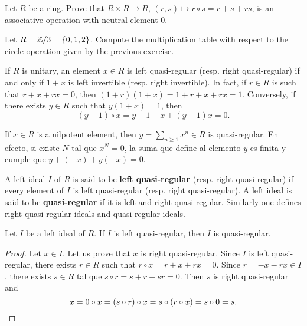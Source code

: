 \begin{exercise}
	\label{exercise:circ}
	Let $R$ be a ring. Prove that $R\times R\to R$,
	$(r,s)\mapsto r\circ s=r+s+rs$, is an associative operation with neutral element $0$.
\end{exercise}

\begin{exercise}
	Let $R=\mathbb{Z}/3=\{0,1,2\}$. Compute the multiplication table with respect to the circle 
 	operation given by the previous exercise.  
\end{exercise}

If $R$ is unitary, an element $x\in R$ is left quasi-regular (resp. right quasi-regular)
if and only if $1+x$ is left invertible (resp. right invertible). In fact, 
if $r\in R$ is such that $r+x+rx=0$, then $(1+r)(1+x)=1+r+x+rx=1$.
Conversely, if there exists $y\in R$ such that $y(1+x)=1$, then  
\[
(y-1)\circ x=y-1+x+(y-1)x=0.
\]

\begin{example}
	If $x\in R$ is a nilpotent element, then $y=\sum_{n\geq1}x^n\in R$ is quasi-regular. 
	En efecto, si existe $N$ tal que $x^N=0$, la suma que
	define al elemento $y$ es finita y cumple que $y+(-x)+y(-x)=0$.  
\end{example}

A left ideal $I$ of $R$ is said to be 
\textbf{left quasi-regular} (resp. right quasi-regular) if every element of $I$ is
left quasi-regular (resp. right quasi-regular). A left ideal 
is said to be \textbf{quasi-regular} if it is left and right quasi-regular. Similarly 
one defines right quasi-regular ideals and quasi-regular ideals. 

\begin{lemma}
	\label{lemma:casiregular}
	Let $I$ be a left ideal of $R$. If $I$ is left quasi-regular, then 
	$I$ is quasi-regular.
\end{lemma}

\begin{proof}
	Let $x\in I$. Let us prove that $x$ is right quasi-regular. Since $I$ is
	left quasi-regular, there exists $r\in R$ such that $r\circ x=r+x+rx=0$. Since 
	$r=-x-rx\in I$, there exists $s\in R$ tal que $s\circ
	r=s+r+sr=0$. Then $s$ is right quasi-regular and  
	\[
	x=0\circ x=(s\circ r)\circ x=s\circ (r\circ x)=s\circ 0=s.\qedhere
	\]
\end{proof}

